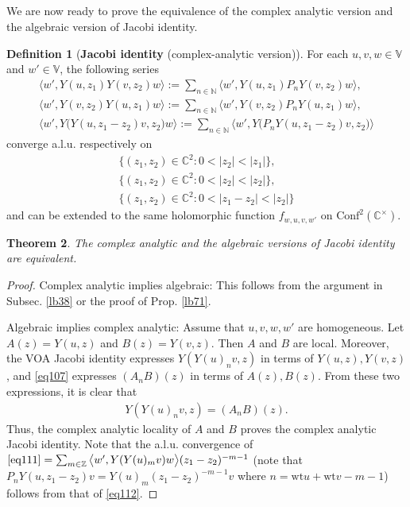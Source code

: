 \documentclass[11pt,b5paper,notitlepage]{article}
\theoremstyle{definition}
\newtheorem{df}{Definition}[section]
\theoremstyle{plain}
\newtheorem{thm}[df]{Theorem}
\newcommand{\Conf}{\mathrm{Conf}}
\newcommand{\bigbk}[1]{\big\langle {#1}\big\rangle}
\newcommand{\Vbb}{\mathbb V}
\newcommand{\Cbb}{\mathbb C}
\newcommand{\Nbb}{\mathbb N}
\newcommand{\Zbb}{\mathbb Z}
\newcommand{\wt}{\mathrm{wt}}
\numberwithin{equation}{section}
\begin{document}
\subsection{}

We are now ready to prove the equivalence of the complex analytic version and the algebraic version of Jacobi identity.

\begin{df}[\textbf{Jacobi identity} (complex-analytic version)]\label{lb194} 
For each $u,v,w\in\Vbb$ and $w'\in\Vbb$, the following series
\begin{subequations}
\begin{gather}
\bigbk{w',Y(u,z_1)Y(v,z_2)w}:=\sum_{n\in\Nbb}\bigbk{w',Y(u,z_1)P_nY(v,z_2)w},\label{eq109}\\
\bigbk{w',Y(v,z_2)Y(u,z_1)w}:=\sum_{n\in\Nbb}\bigbk{w',Y(v,z_2)P_nY(u,z_1)w},\label{eq110}\\
\bigbk{w',Y\big(Y(u,z_1-z_2)v,z_2\big)w}:=\sum_{n\in\Nbb}\bigbk{w',Y\big(P_nY(u,z_1-z_2)v,z_2\big)}\label{eq111}
\end{gather}	
\end{subequations}
converge a.l.u. respectively on
\begin{subequations}
\begin{gather}
\{(z_1,z_2)\in\Cbb^2:0<|z_2|<|z_1|\},\\
\{(z_1,z_2)\in\Cbb^2:0<|z_2|<|z_2|\},\\
\{(z_1,z_2)\in\Cbb^2:0<|z_1-z_2|<|z_2|\}
\end{gather}	
\end{subequations}
and can be extended to the same holomorphic function $f_{w,u,v,w'}$ on $\Conf^2(\Cbb^\times)$.
\end{df}

\begin{thm}
The complex analytic and the algebraic versions of Jacobi identity are equivalent.
\end{thm}

\begin{proof}
Complex analytic implies algebraic: This follows from the argument in Subsec. \ref{lb38} or the proof of Prop. \ref{lb71}.

Algebraic implies complex analytic: Assume that $u,v,w,w'$ are homogeneous. Let $A(z)=Y(u,z)$ and $B(z)=Y(v,z)$. Then $A$ and $B$ are local. Moreover, the VOA Jacobi identity expresses $Y(Y(u)_nv,z)$ in terms of $Y(u,z),Y(v,z)$, and \eqref{eq107} expresses $(A_nB)(z)$ in terms of $A(z),B(z)$. From these two expressions, it is clear that
\begin{align}
Y(Y(u)_nv,z)=(A_nB)(z).	\label{eq118}
\end{align}
Thus, the complex analytic locality of $A$ and $B$ proves the complex analytic Jacobi identity. Note that the a.l.u. convergence of $\eqref{eq111}=\sum_{m\in\Zbb}\bigbk{w',Y(Y(u)_mv)w}(z_1-z_2)^{-m-1}$ (note that $P_n Y(u,z_1-z_2)v=Y(u)_m(z_1-z_2)^{-m-1}v$ where $n=\wt u+\wt v-m-1$) follows from that of \eqref{eq112}.
\end{proof}
\end{document}
